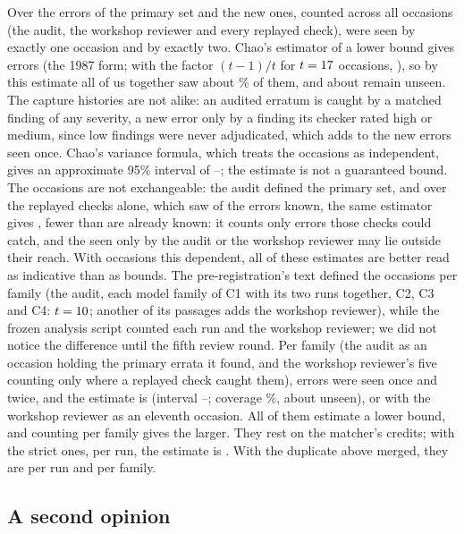 \documentclass[11pt]{article}
\begin{document}
Over the \ChaoS{} errors of the primary set and the new ones, counted across all occasions (the audit, the workshop reviewer and
every replayed check), \ChaoFone{} were seen by exactly one occasion and \ChaoFtwo{} by exactly two. Chao's estimator of a lower bound
gives \ChaoNexact{} errors (the 1987 form; with the factor $(t-1)/t$ for $t=17$ occasions, \ChaoNt), so by this estimate all of
us together saw about \ChaoCover\% of them, and about \ChaoUnseen{} remain unseen. The capture histories are not
alike: an audited erratum is
caught by a matched finding of any severity, a new error only by a finding its checker rated high or medium, since low findings were
never adjudicated, which adds to the new errors seen once. Chao's variance
formula, which treats the occasions as independent, gives an approximate 95\% interval of \ChaoLo--\ChaoHi; the estimate is not a
guaranteed bound. The occasions are not exchangeable: the audit defined the primary set, and over the replayed checks
alone, which saw \ChaoReplayedS{} of the \ChaoS{} errors known, the same estimator gives \ChaoReplayedN{}, fewer than are already
known: it counts only errors those checks could catch, and the \ChaoOnlyHist{} seen only by the audit or the workshop reviewer may lie
outside their reach. With occasions this dependent, all of these estimates are better read as indicative than as bounds. The
pre-registration's text defined the occasions per family (the audit, each model family of C1 with its two runs together, C2, C3 and
C4: $t=10$; another of its passages adds the workshop reviewer), while the frozen analysis script counted each run and the
workshop reviewer; we did not notice the difference until the fifth review round. Per family (the audit as an occasion holding the \ChaoAuditN{}
primary errata it found, and the workshop reviewer's five counting only where a replayed check caught them), \ChaoFamFone{} errors
were seen once
and \ChaoFamFtwo{} twice, and the estimate is \ChaoFamNexact{} (interval \ChaoFamLo--\ChaoFamHi; coverage \ChaoFamCover\%, about
\ChaoFamUnseen{} unseen), or \ChaoFamHNexact{} with the workshop reviewer as an eleventh occasion. All of them estimate a
lower bound, and counting per family gives the larger. They rest on the matcher's credits; with the strict ones, per run, the
estimate is \StrictChaoNexact. With the duplicate above merged, they are \ChaoDedupNexact{} per run and \ChaoFamDedupNexact{} per
family.

\subsection{A second opinion}
\end{document}
